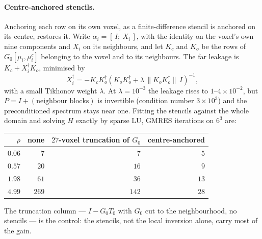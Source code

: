 \documentclass[11pt,a4paper]{article}
\newcommand{\Tz}{T_0}
\newcommand{\Gz}{G_0}
\begin{document}
\paragraph{Centre-anchored stencils.} Anchoring each row on its own voxel, as a finite-difference
stencil is anchored on its centre, restores it. Write $\alpha_i = [\,I;\ X_i\,]$, with the
identity on the voxel's own nine components and $X_i$ on its neighbours, and let $K_c$ and $K_o$
be the rows of $\Gz[\mu_i,\mu_i^{c}]$ belonging to the voxel and to its neighbours. The far
leakage is $K_c + X_i^{\dagger}K_o$, minimised by
\begin{equation}
X_i^{\dagger} = -K_c K_o^{\dagger}\left(K_o K_o^{\dagger} + \lambda\,\|K_o K_o^{\dagger}\|\,I\right)^{-1},
\label{eq:centred}
\end{equation}
with a small Tikhonov weight $\lambda$. At $\lambda = 10^{-3}$ the leakage rises to
$1$--$4\times10^{-2}$, but $P = I + (\text{neighbour blocks})$ is invertible (condition number
$3\times10^{3}$) and the preconditioned spectrum stays near one. Fitting the stencils against
the whole domain and solving $H$ exactly by sparse LU, GMRES iterations on $6^3$ are:
\begin{center}
\begin{tabular}{@{}rrrr@{}}
\toprule
$\rho$ & none & $27$-voxel truncation of $\Gz$ & centre-anchored \\
\midrule
$0.06$ & $7$ & $7$ & $5$\\
$0.57$ & $20$ & $16$ & $9$\\
$1.98$ & $61$ & $36$ & $13$\\
$4.99$ & $269$ & $142$ & $28$\\
\bottomrule
\end{tabular}
\end{center}
The truncation column --- $I-\Gz\Tz$ with $\Gz$ cut to the neighbourhood, no stencils --- is the
control: the stencils, not the local inversion alone, carry most of the gain.
\end{document}
